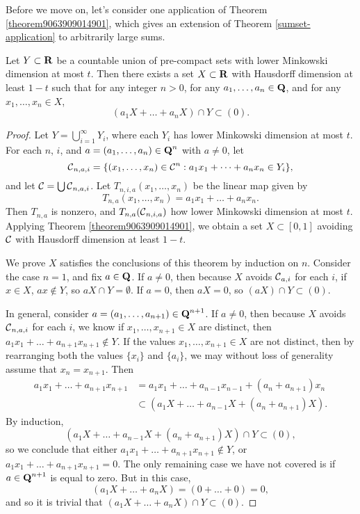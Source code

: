 Before we move on, let's consider one application of Theorem \ref{theorem9063909014901}, which gives an extension of Theorem \ref{sumset-application} to arbitrarily large sums.

\begin{theorem}
    Let $Y \subset \operatorname{\mathbf{R}}$ be a countable union of pre-compact sets with lower Minkowski dimension at most $t$. Then there exists a set $X \subset \operatorname{\mathbf{R}}$ with Hausdorff dimension at least $1 - t$ such that for any integer $n > 0$, for any $a_1, \dots, a_n \in \operatorname{\mathbf{Q}}$, and for any $x_1, \dots, x_n \in X$,
    \[ (a_1X + \dots + a_n X) \cap Y \subset (0). \]
\end{theorem}
\begin{proof}
    Let $Y = \bigcup_{i = 1}^\infty Y_i$, where each $Y_i$ has lower Minkowski dimension at most $t$. For each $n$, $i$, and $a = (a_1, \dots, a_n) \in \operatorname{\mathbf{Q}}^n$ with $a \neq 0$, let
    \[ \operatorname{\mathcal{C}}_{n,a,i} = \{ (x_1, \dots, x_n) \in \operatorname{\mathcal{C}}^n : a_1x_1 + \dots + a_nx_n \in Y_i \}, \]
    and let $\operatorname{\mathcal{C}} = \bigcup \operatorname{\mathcal{C}}_{n,a,i}$. Let $T_{n,i,a}(x_1,\dots,x_n)$ be the linear map given by
    \[ T_{n,a}(x_1,\dots,x_n) = a_1x_1 + \dots + a_nx_n. \]
    Then $T_{n,a}$ is nonzero, and $T_{n,a}(\operatorname{\mathcal{C}}_{n,i,a})$ how lower Minkowski dimension at most $t$. Applying Theorem \ref{theorem9063909014901}, we obtain a set $X \subset [0,1]$ avoiding $\operatorname{\mathcal{C}}$ with Hausdorff dimension at least $1 - t$.

    We prove $X$ satisfies the conclusions of this theorem by induction on $n$. Consider the case $n = 1$, and fix $a \in \operatorname{\mathbf{Q}}$. If $a \neq 0$, then because $X$ avoids $\operatorname{\mathcal{C}}_{a,i}$ for each $i$, if $x \in X$, $ax \not \in Y$, so $aX \cap Y = \emptyset$. If $a = 0$, then $aX = 0$, so $(aX) \cap Y \subset (0)$.

    In general, consider $a = (a_1, \dots, a_{n+1}) \in \operatorname{\mathbf{Q}}^{n+1}$. If $a \neq 0$, then because $X$ avoids $\operatorname{\mathcal{C}}_{n,a,i}$ for each $i$, we know if $x_1, \dots, x_{n+1} \in X$ are distinct, then $a_1 x_1 + \dots + a_{n+1} x_{n+1} \not \in Y$. If the values $x_1, \dots, x_{n+1} \in X$ are not distinct, then by rearranging both the values $\{ x_i \}$ and $\{ a_i \}$, we may without loss of generality assume that $x_n = x_{n+1}$. Then
    \begin{align*}
        a_1 x_1 + \dots + a_{n+1} x_{n+1} &= a_1 x_1 + \dots + a_{n-1} x_{n-1} + (a_n + a_{n+1}) x_n\\
        &\subset (a_1 X + \dots + a_{n-1} X + (a_n + a_{n+1}) X).
    \end{align*}
    By induction,
    \[ (a_1 X + \dots + a_{n-1} X + (a_n + a_{n+1}) X) \cap Y \subset (0), \]
    so we conclude that either $a_1 x_1 + \dots + a_{n+1} x_{n+1} \not \in Y$, or $a_1x_1 + \dots + a_{n+1} x_{n+1} = 0$. The only remaining case we have not covered is if $a \in \operatorname{\mathbf{Q}}^{n+1}$ is equal to zero. But in this case,
    \[ (a_1 X + \dots + a_n X) = (0 + \dots + 0) = 0, \]
    and so it is trivial that $(a_1 X + \dots + a_n X) \cap Y \subset (0)$.
\end{proof}

